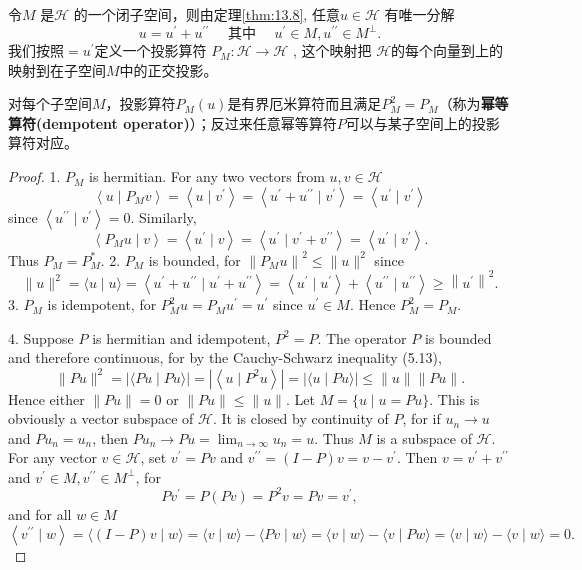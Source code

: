 令$M$ 是$\mathcal{H}$ 的一个闭子空间，则由定理\ref{thm:13.8}, 任意$u \in \mathcal{H}$ 有唯一分解
$$
u=u^{\prime}+u^{\prime \prime} \quad \text { 其中 } \quad u^{\prime} \in M, u^{\prime \prime} \in M^{\perp} .
$$
我们按照$=u^{\prime}$定义一个投影算符 $P_{M}: \mathcal{H} \rightarrow \mathcal{H}$ , 这个映射把 $\mathcal{H}$的每个向量到上的映射到在子空间$M$中的正交投影。
\begin{theorem}
    对每个子空间\(M\)，投影算符\(P_{M}(u)\)是有界厄米算符而且满足\(P^2_{M}=P_{M}\)（称为\textbf{幂等算符(dempotent operator)}）；反过来任意幂等算符\(P\)可以与某子空间上的投影算符对应。
\end{theorem}
\begin{proof}
     1. $P_{M}$ is hermitian. For any two vectors from $u, v \in \mathcal{H}$
$$
\left\langle u \mid P_{M} v\right\rangle=\left\langle u \mid v^{\prime}\right\rangle=\left\langle u^{\prime}+u^{\prime \prime} \mid v^{\prime}\right\rangle=\left\langle u^{\prime} \mid v^{\prime}\right\rangle
$$
since $\left\langle u^{\prime \prime} \mid v^{\prime}\right\rangle=0$. Similarly,
$$
\left\langle P_{M} u \mid v\right\rangle=\left\langle u^{\prime} \mid v\right\rangle=\left\langle u^{\prime} \mid v^{\prime}+v^{\prime \prime}\right\rangle=\left\langle u^{\prime} \mid v^{\prime}\right\rangle .
$$
Thus $P_{M}=P_{M}^{*}$.
2. $P_{M}$ is bounded, for $\left\|P_{M} u\right\|^{2} \leq\|u\|^{2}$ since
$$
\|u\|^{2}=\langle u \mid u\rangle=\left\langle u^{\prime}+u^{\prime \prime} \mid u^{\prime}+u^{\prime \prime}\right\rangle=\left\langle u^{\prime} \mid u^{\prime}\right\rangle+\left\langle u^{\prime \prime} \mid u^{\prime \prime}\right\rangle \geq\left\|u^{\prime}\right\|^{2} .
$$
3. $P_{M}$ is idempotent, for $P_{M}^{2} u=P_{M} u^{\prime}=u^{\prime}$ since $u^{\prime} \in M$. Hence $P_{M}^{2}=P_{M}$.

4. Suppose $P$ is hermitian and idempotent, $P^{2}=P$. The operator $P$ is bounded and therefore continuous, for by the Cauchy-Schwarz inequality (5.13),
$$
\|P u\|^{2}=|\langle P u \mid P u\rangle|=\left|\left\langle u \mid P^{2} u\right\rangle\right|=|\langle u \mid P u\rangle| \leq\|u\|\|P u\| .
$$
Hence either $\|P u\|=0$ or $\|P u\| \leq\|u\|$.
Let $M=\{u \mid u=P u\}$. This is obviously a vector subspace of $\mathcal{H}$. It is closed by continuity of $P$, for if $u_{n} \rightarrow u$ and $P u_{n}=u_{n}$, then $P u_{n} \rightarrow P u=\lim _{n \rightarrow \infty} u_{n}=u$. Thus $M$ is a subspace of $\mathcal{H}$. For any vector $v \in \mathcal{H}$, set $v^{\prime}=P v$ and $v^{\prime \prime}=(I-P) v=v-v^{\prime}$. Then $v=v^{\prime}+v^{\prime \prime}$ and $v^{\prime} \in M, v^{\prime \prime} \in M^{\perp}$, for
$$
P v^{\prime}=P(P v)=P^{2} v=P v=v^{\prime},
$$
and for all $w \in M$
$$
\left\langle v^{\prime \prime} \mid w\right\rangle=\langle(I-P) v \mid w\rangle=\langle v \mid w\rangle-\langle P v \mid w\rangle=\langle v \mid w\rangle-\langle v \mid P w\rangle=\langle v \mid w\rangle-\langle v \mid w\rangle=0 .
$$
\end{proof}
